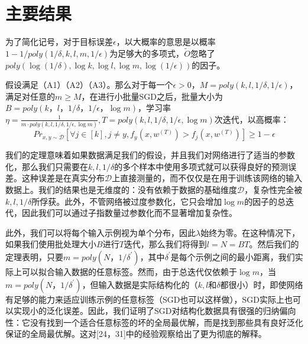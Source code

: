 \section{主要结果}
为了简化记号，对于目标误差$\epsilon$，以大概率的意思是以概率$1-1/poly(1/\delta,k,l,m,1/\epsilon)$为足够大的多项式，$\tilde{O}$忽略了$poly(\log(1/\delta),\log k, \log l, \log m,\log (1/\epsilon))$的因子。
\begin{theorem}
假设满足（A1）（A2）（A3）。那么对于每一个$\epsilon > 0$，$M = poly(k,l,1/\delta,1/\epsilon)$，满足对任意的$m\geq M$，在进行小批量SGD之后，批量大小为$B=poly(k，l，1/\delta，1/\epsilon，\log m)$，学习率$\eta = \frac{1}{m\cdot poly(k,l,1/\delta,1/\epsilon,\log m)}, T = poly(k,l,1/\delta,1/\epsilon,\log m)$次迭代，以高概率：
\[
Pr_{x,y\sim \mathcal{D}}[\forall j \in [k], j\neq y, f_y(x,w^{(T)}) > f_j(x,w^{(T)})] \geq 1-\epsilon 
\]
\end{theorem}
\par
我们的定理意味着如果数据满足我们的假设，并且我们对网络进行了适当的参数化，那么我们只需要在$k,l,1/\delta$的多个样本中使用多项式就可以获得良好的预测误差。这种误差是在真实分布$\mathcal{D}$上直接测量的，而不仅仅是在用于训练该网络的输入数据上。我们的结果也是无维度的：没有依赖于数据的基础维度$\mathcal{D}$，复杂性完全被$k,l,1/\delta$所俘获。此外，不管网络被过度参数化，它只会增加$\log m$的因子的总迭代，因此我们可以通过子指数量过参数化而不显著增加复杂性。
\par
此外，我们可以将每个输入示例视为单个分布，因此$\lambda$始终为零。在这种情况下，如果我们使用批处理大小$B$进行$T$迭代，那么我们将得到$l=N=BT$。然后我们的定理表明，只要$m=poly(N，1/\delta^\prime)$，其中$\delta^\prime$是每个示例之间的最小距离，我们实际上可以拟合输入数据的任意标签。然而，由于总迭代仅依赖于$\log m$，当$m=poly(N，1/\delta^\prime)$，但输入数据是实际结构化的（$k,l$和$\delta$都很小）时，即使网络有足够的能力来适应训练示例的任意标签（SGD也可以这样做），SGD实际上也可以实现小的泛化误差。因此，我们证明了SGD对结构化数据具有很强的归纳偏向性：它没有找到一个适合任意标签的坏的全局最优解，而是找到那些具有良好泛化保证的全局最优解。这对[24，31]中的经验观察给出了更为彻底的解释。

